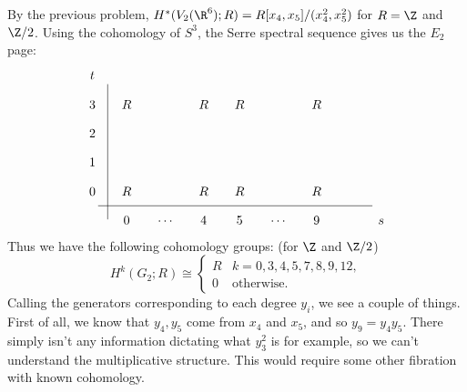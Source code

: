 \documentclass[11pt,letterpaper]{article}
\begin{document}
\begin{solution}
    \quad By the previous problem, $H^*(V_2(\R^6); R) =R[x_4, x_5] / (x_4^2, x_5^2)$ for $R=\Z$ and $\Z /2$. Using the cohomology of $S^3$, the Serre spectral sequence gives us the $E_2$ page:
    \[\begin{tikzcd}[column sep = small, row sep = small]
        t \\
        3 & R && R & R && R \\
        2 \\
        1 & {} \\
        0 & R & {} & R & R && R \\
        {} & 0 & \cdots & 4 & 5 & \cdots & 9 &&& s
        \arrow[shift left=5, no head, from=6-1, to=6-10]
        \arrow[shift right=5, no head, from=6-1, to=1-1]
    \end{tikzcd}\]
    Thus we have the following cohomology groups: (for $\Z$ and $\Z /2$)
    \[
        H^k(G_2; R)\cong \begin{cases}
            R & k=0,3,4,5,7,8,9,12,\\
            0 & \textrm{otherwise}.
        \end{cases}
    \]
    Calling the generators corresponding to each degree $y_i$, we see a couple of things. First of all, we know that $y_4, y_5$ come from $x_4$ and $x_5$, and so $y_9=y_4y_5$. There simply isn't any information dictating what $y_3^2$ is for example, so we can't understand the multiplicative structure. This would require some other fibration with known cohomology.
\end{solution}
\end{document}
